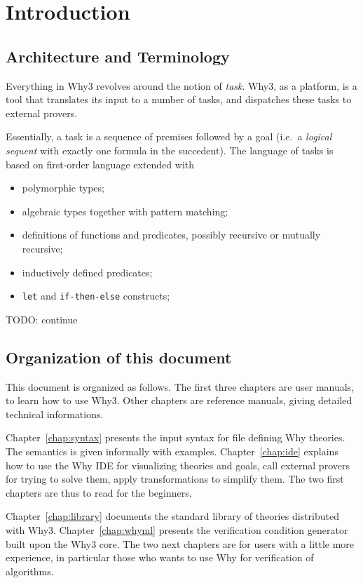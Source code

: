 
\chapter{Introduction}

\section{Architecture and Terminology}

Everything in Why3 revolves around the notion of
\emph{task}.  Why3, as a platform, is a tool that
translates its input to a number of tasks, and dispatches these tasks
to external provers. 

Essentially, a task is a sequence of premises followed by a goal
(i.e.~a \emph{logical sequent} with exactly one formula in the
succedent). The language of tasks is based on first-order language
extended with 
\begin{itemize}
\item polymorphic types;
\item algebraic types together with pattern matching;
\item definitions of functions and predicates, possibly recursive or
  mutually recursive;
\item inductively defined predicates;
\item \texttt{let} and \texttt{if-then-else} constructs;
\end{itemize}

TODO: continue

\section{Organization of this document}

This document is organized as follows. The first three chapters are
user manuals, to learn how to use Why3. Other chapters are reference
manuals, giving detailed technical informations.

Chapter~\ref{chap:syntax} presents the input syntax for file defining
Why theories. The semantics is given informally with examples.
Chapter~\ref{chap:ide} explains how to use the Why IDE for visualizing
theories and goals, call external provers for trying to solve them,
apply transformations to simplify them. The two first chapters are
thus to read for the beginners.

Chapter~\ref{chap:library} documents the standard library of theories
distributed with Why3. Chapter~\ref{chap:whyml} presents the
verification condition generator built upon the Why3 core.  The two
next chapters are for users with a little more experience, in
particular those who wants to use Why for verification of algorithms.

